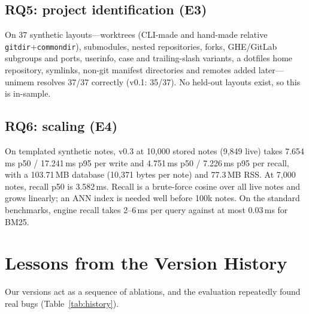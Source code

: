\documentclass[10pt,twocolumn]{article}
\newcommand{\sys}{\textsf{unimem}}
\newcommand{\code}[1]{\texttt{\small #1}}
\begin{document}
\subsection{RQ5: project identification (E3)}
\label{sec:rq5}
On 37 synthetic layouts---worktrees (CLI-made and hand-made relative \code{gitdir}+\code{commondir}), submodules, nested
repositories, forks, GHE/GitLab subgroups and ports, userinfo, case and trailing-slash variants, a dotfiles home
repository, symlinks, non-git manifest directories and remotes added later---\sys{} resolves 37/37 correctly (v0.1: 35/37).
No held-out layouts exist, so this is in-sample.

\subsection{RQ6: scaling (E4)}
\label{sec:rq6}
On templated synthetic notes, v0.3 at 10,000 stored notes (9,849 live) takes 7.654\,ms p50 / 17.241\,ms p95 per write and
4.751\,ms p50 / 7.226\,ms p95 per recall, with a 103.71\,MB database (10,371 bytes per note) and 77.3\,MB RSS. At 7,000
notes, recall p50 is 3.582\,ms. Recall is a brute-force cosine over all live notes and grows linearly; an ANN index is
needed well before 100k notes. On the standard benchmarks, engine recall takes 2--6\,ms per query against at most
0.03\,ms for BM25.

\section{Lessons from the Version History}
\label{sec:lessons}
Our versions act as a sequence of ablations, and the evaluation repeatedly found real bugs (Table~\ref{tab:history}).
\end{document}
